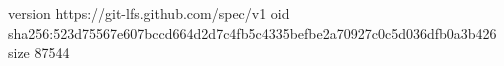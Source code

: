 version https://git-lfs.github.com/spec/v1
oid sha256:523d75567e607bccd664d2d7c4fb5c4335befbe2a70927c0c5d036dfb0a3b426
size 87544

